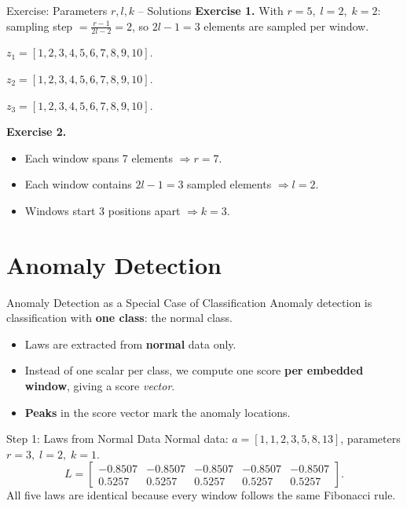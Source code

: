 \documentclass{beamer}
\begin{document}
\begin{frame}{Exercise: Parameters \(r, l, k\) -- Solutions}
  \textbf{Exercise 1.} With \(r=5,\; l=2,\; k=2\): sampling step \(= \tfrac{r-1}{2l-2} = 2\), so \(2l-1=3\) elements are sampled per window.

  \vspace{0.3em}
  \(z_1 = [\boxed{\boxed{1}, 2, \boxed{3}, 4, \boxed{5}}, 6, 7, 8, 9, 10].\)

  \(z_2 = [1, 2, \boxed{\boxed{3}, 4, \boxed{5}, 6, \boxed{7}}, 8, 9, 10].\)

  \(z_3 = [1, 2, 3, 4, \boxed{\boxed{5}, 6, \boxed{7}, 8, \boxed{9}}, 10].\)

  \vspace{0.5em}
  \textbf{Exercise 2.}
  \begin{itemize}
    \item Each window spans 7 elements \(\Rightarrow r = 7\).
    \item Each window contains \(2l-1 = 3\) sampled elements \(\Rightarrow l = 2\).
    \item Windows start 3 positions apart \(\Rightarrow k = 3\).
  \end{itemize}
\end{frame}

\section{Anomaly Detection}

\begin{frame}{Anomaly Detection as a Special Case of Classification}
  Anomaly detection is classification with \textbf{one class}: the normal class.
  \begin{itemize}
    \item Laws are extracted from \textbf{normal} data only.
    \item Instead of one scalar per class, we compute one score \textbf{per embedded window}, giving a score \emph{vector}.
    \item \textbf{Peaks} in the score vector mark the anomaly locations.
  \end{itemize}
\end{frame}

\begin{frame}{Step 1: Laws from Normal Data}
  Normal data: \(a = [1, 1, 2, 3, 5, 8, 13]\), parameters \(r=3,\; l=2,\; k=1\).
  \begin{equation}
    L = \begin{bmatrix}
      -0.8507 & -0.8507 & -0.8507 & -0.8507 & -0.8507 \\
       0.5257 &  0.5257 &  0.5257 &  0.5257 &  0.5257
    \end{bmatrix}.
  \end{equation}
  All five laws are identical because every window follows the same Fibonacci rule.
\end{frame}
\end{document}

